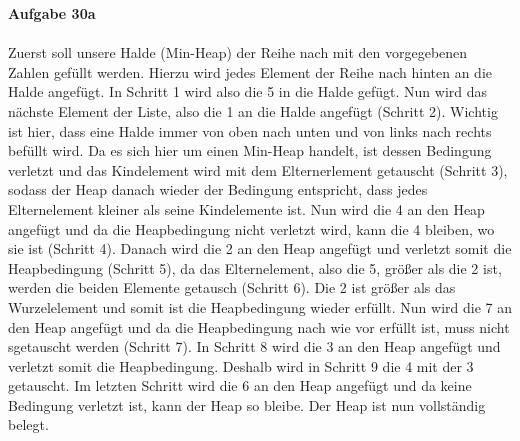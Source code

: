 \documentclass{article}
\begin{document}
\large{\hspace*{-5mm}\textbf{Aufgabe 30a}}
\\\\\large{Zuerst soll unsere Halde (Min-Heap) der Reihe nach mit den vorgegebenen Zahlen gefüllt werden. Hierzu wird jedes Element der Reihe nach hinten an die Halde angefügt.
In Schritt 1 wird also die 5 in die Halde gefügt. Nun wird das nächste Element der Liste, also die 1 an die Halde angefügt (Schritt 2). Wichtig ist hier, dass eine Halde immer von oben nach unten und von links nach rechts befüllt wird. Da es sich hier um einen Min-Heap handelt, ist dessen Bedingung verletzt und das Kindelement wird mit dem Elternerlement getauscht (Schritt 3), sodass der Heap danach wieder der Bedingung entspricht, dass jedes Elternelement kleiner als seine Kindelemente ist. Nun wird die 4 an den Heap angefügt und da die Heapbedingung nicht verletzt wird, kann die 4 bleiben, wo sie ist (Schritt 4).
Danach wird die 2 an den Heap angefügt und verletzt somit die Heapbedingung (Schritt 5), da das Elternelement, also die 5, größer als die 2 ist, werden die beiden Elemente getausch (Schritt 6). Die 2 ist größer als das Wurzelelement und somit ist die Heapbedingung wieder erfüllt. Nun wird die 7 an den Heap angefügt und da die Heapbedingung nach wie vor erfüllt ist, muss nicht sgetauscht werden (Schritt 7). In Schritt 8 wird die 3 an den Heap angefügt und verletzt somit die Heapbedingung. Deshalb wird in Schritt 9 die 4 mit der 3 getauscht. Im letzten Schritt wird die 6 an den Heap angefügt und da keine Bedingung verletzt ist, kann der Heap so bleibe. Der Heap ist nun vollständig belegt.}
\end{document}
